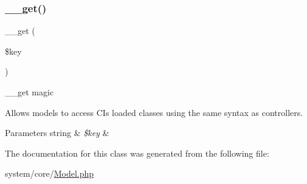 \subsubsection{\texorpdfstring{\+\_\+\+\_\+get()}{\_\_get()}}
{\footnotesize\ttfamily \+\_\+\+\_\+get (\begin{DoxyParamCaption}\item[{}]{\$key }\end{DoxyParamCaption})}

\+\_\+\+\_\+get magic

Allows models to access CI\textquotesingle{}s loaded classes using the same syntax as controllers.


\begin{DoxyParams}[1]{Parameters}
string & {\em \$key} & \\
\hline
\end{DoxyParams}


The documentation for this class was generated from the following file\+:\begin{DoxyCompactItemize}
\item 
system/core/\mbox{\hyperlink{_model_8php}{Model.\+php}}\end{DoxyCompactItemize}
